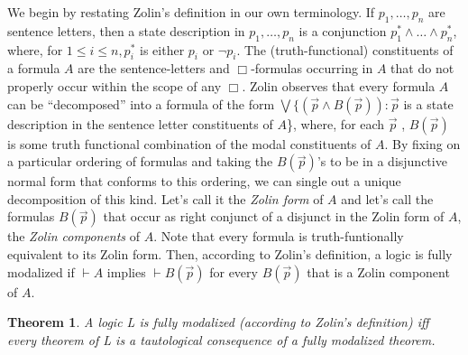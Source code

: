 \documentclass[11pt]{article}
\begin{document}
We begin by restating Zolin's definition in our own terminology. If $p_1,{\ldots},p_n$ are sentence letters, then a state description in ${p_1,{\ldots},p_n}$ is a conjunction $p_1^*\wedge {\ldots}\wedge p_n^*$, where, for $1\le i\le n, p_i^*$ is either $p_i$ or $\neg p_i$. The (truth-functional) constituents of a formula $A$ are the sentence-letters and $\Box $-formulas occurring in $A$ that do not properly occur within the scope of any $\Box $. Zolin observes that every formula $A$ can be ``decomposed'' into a formula of the form ${\bigvee}\{(\vec{p}\wedge B(\vec{p}))\!:\vec{p}$ is a state description in the sentence letter constituents of $A$\}, where, for each $\vec{p}$ , $B(\vec{p})$ is some truth functional combination of the modal constituents of $A$. By fixing on a particular ordering of formulas and taking the $B(\vec{p})$'s to be in a disjunctive normal form that conforms to this ordering, we can single out a unique decomposition of this kind. Let's call it the \textit{Zolin form} of $A$ and let's call the formulas $B(\vec{p})$ that occur as right conjunct of a disjunct in the Zolin form of $A$, the \textit{Zolin components} of $A$. Note that every formula is truth-funtionally equivalent to its Zolin form. Then, according to Zolin's definition, a logic is fully modalized if $\vdash A$ implies $\vdash B(\vec{p})$ for every $B(\vec{p})$ that is a Zolin component of $A$. 
\renewcommand\qedsymbol{$\blacksquare$}
\newtheorem*{theorem}{Theorem}
\begin{theorem}
A logic L is fully modalized (according to Zolin's definition) iff every theorem of L is a tautological consequence of a fully modalized theorem.
\end{theorem}
\end{document}
